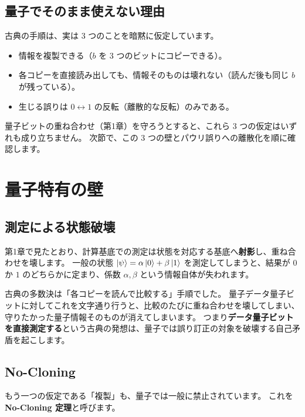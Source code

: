 \subsection{量子でそのまま使えない理由}

古典の手順は、実は 3 つのことを暗黙に仮定しています。

\begin{itemize}
  \item 情報を複製できる（$b$ を 3 つのビットにコピーできる）。
  \item 各コピーを直接読み出しても、情報そのものは壊れない（読んだ後も同じ $b$ が残っている）。
  \item 生じる誤りは $0 \leftrightarrow 1$ の反転（離散的な反転）のみである。
\end{itemize}

量子ビットの重ね合わせ（第1章）を守ろうとすると、これら 3 つの仮定はいずれも成り立ちません。
次節で、この 3 つの壁とパウリ誤りへの離散化を順に確認します。

\section{量子特有の壁}\label{sec:quantum_walls}

\subsection{測定による状態破壊}

第1章で見たとおり、計算基底での測定は状態を対応する基底へ\textbf{射影}し、重ね合わせを壊します。
一般の状態 $\ket{\psi}=\alpha\ket{0}+\beta\ket{1}$ を測定してしまうと、結果が $0$ か $1$ のどちらかに定まり、係数 $\alpha,\beta$ という情報自体が失われます。

古典の多数決は「各コピーを読んで比較する」手順でした。
量子データ量子ビットに対してこれを文字通り行うと、比較のたびに重ね合わせを壊してしまい、守りたかった量子情報そのものが消えてしまいます。
つまり\textbf{データ量子ビットを直接測定する}という古典の発想は、量子では誤り訂正の対象を破壊する自己矛盾を起こします。

\subsection{No-Cloning}

もう一つの仮定である「複製」も、量子では一般に禁止されています。
これを\textbf{No-Cloning 定理}と呼びます。

